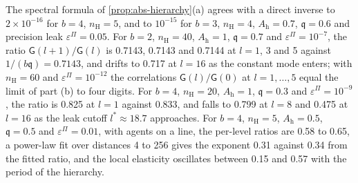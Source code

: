 \begin{numcheck}\label{chk:abs-hierarchy}
The spectral formula of \cref{prop:abs-hierarchy}(a) agrees with a direct inverse to $2\times10^{-16}$ for $b=4$, $n_{\mathrm H}=5$, and to $10^{-15}$ for $b=3$, $n_{\mathrm H}=4$, $A_{\mathrm h}=0.7$, $\mathfrak q=0.6$ and precision leak $\varepsilon^\Pi=0.05$. For $b=2$, $n_{\mathrm H}=40$, $A_{\mathrm h}=1$, $\mathfrak q=0.7$ and $\varepsilon^\Pi=10^{-7}$, the ratio $\mathsf G(l+1)/\mathsf G(l)$ is 0.7143, 0.7143 and 0.7144 at $l=1$, 3 and 5 against $1/(b\mathfrak q)=0.7143$, and drifts to 0.717 at $l=16$ as the constant mode enters; with $n_{\mathrm H}=60$ and $\varepsilon^\Pi=10^{-12}$ the correlations $\mathsf G(l)/\mathsf G(0)$ at $l=1,\dots,5$ equal the limit of part (b) to four digits. For $b=4$, $n_{\mathrm H}=20$, $A_{\mathrm h}=1$, $\mathfrak q=0.3$ and $\varepsilon^\Pi=10^{-9}$, the ratio is 0.825 at $l=1$ against 0.833, and falls to 0.799 at $l=8$ and 0.475 at $l=16$ as the leak cutoff $l^\ast\approx18.7$ approaches. For $b=4$, $n_{\mathrm H}=5$, $A_{\mathrm h}=0.5$, $\mathfrak q=0.5$ and $\varepsilon^\Pi=0.01$, with agents on a line, the per-level ratios are 0.58 to 0.65, a power-law fit over distances 4 to 256 gives the exponent 0.31 against 0.34 from the fitted ratio, and the local elasticity oscillates between 0.15 and 0.57 with the period of the hierarchy.
\end{numcheck}

